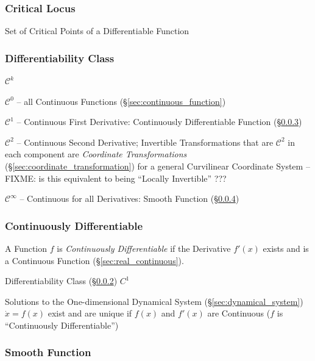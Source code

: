 {\subsubsection{Critical Locus}\label{sec:critical_locus}

Set of Critical Points of a Differentiable Function



\subsubsection{Differentiability Class}\label{sec:differentiability_class}

$\mathcal{C}^k$

$\mathcal{C}^0$ -- all Continuous Functions (\S\ref{sec:continuous_function})

$\mathcal{C}^1$ -- Continuous First Derivative: Continuously Differentiable
Function (\S\ref{sec:continuously_differentiable})

$\mathcal{C}^2$ -- Continuous Second Derivative; Invertible Transformations that
are $\mathcal{C}^2$ in each component are \emph{Coordinate Transformations}
(\S\ref{sec:coordinate_transformation}) for a general Curvilinear Coordinate
System --FIXME: is this equivalent to being ``Locally Invertible'' ???

$\mathcal{C}^\infty$ -- Continuous for all Derivatives: Smooth Function
(\S\ref{sec:smooth_function})



\subsubsection{Continuously Differentiable}
\label{sec:continuously_differentiable}

A Function $f$ is \emph{Continuously Differentiable} if the Derivative $f'(x)$
exists and is a Continuous Function (\S\ref{sec:real_continuous}).

Differentiability Class (\S\ref{sec:differentiability_class}) $C^1$

Solutions to the One-dimensional Dynamical System
(\S\ref{sec:dynamical_system}) $\dot{x} = f(x)$ exist and are unique if $f(x)$
and $f'(x)$ are Continuous ($f$ is ``Continuously Differentiable'')



\subsubsection{Smooth Function}\label{sec:smooth_function}

}
